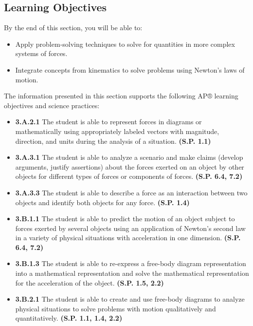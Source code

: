\documentclass[
]{book}
\providecommand{\tightlist}{%
  \setlength{\itemsep}{0pt}\setlength{\parskip}{0pt}}
\newenvironment{learning-objectives}{}{}
\begin{document}
\hypertarget{fs-id2160702}{}
\begin{learning-objectives}

\hypertarget{learning-objectives-18}{%
\subsection{Learning Objectives}\label{learning-objectives-18}}

By the end of this section, you will be able to:

\begin{itemize}
\tightlist
\item
  Apply problem-solving techniques to solve for quantities in more
  complex systems of forces.
\item
  Integrate concepts from kinematics to solve problems using Newton's
  laws of motion.
\end{itemize}

The information presented in this section supports the following AP®
learning objectives and science practices:

\begin{itemize}
\tightlist
\item
  \textbf{3.A.2.1} The student is able to represent forces in diagrams or
  mathematically using appropriately labeled vectors with magnitude,
  direction, and units during the analysis of a situation. \textbf{(S.P.
  1.1)}
\item
  \textbf{3.A.3.1} The student is able to analyze a scenario and make
  claims (develop arguments, justify assertions) about the forces
  exerted on an object by other objects for different types of forces
  or components of forces. \textbf{(S.P. 6.4, 7.2)}
\item
  \textbf{3.A.3.3} The student is able to describe a force as an
  interaction between two objects and identify both objects for any
  force. \textbf{(S.P. 1.4)}
\item
  \textbf{3.B.1.1} The student is able to predict the motion of an object
  subject to forces exerted by several objects using an application of
  Newton's second law in a variety of physical situations with
  acceleration in one dimension. \textbf{(S.P. 6.4, 7.2)}
\item
  \textbf{3.B.1.3} The student is able to re-express a free-body diagram
  representation into a mathematical representation and solve the
  mathematical representation for the acceleration of the object.
  \textbf{(S.P. 1.5, 2.2)}
\item
  \textbf{3.B.2.1} The student is able to create and use free-body diagrams
  to analyze physical situations to solve problems with motion
  qualitatively and quantitatively. \textbf{(S.P. 1.1, 1.4, 2.2)}
\end{itemize}

\end{learning-objectives}
\end{document}
